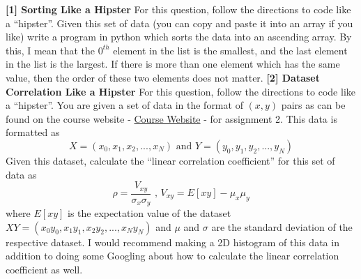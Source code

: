 \documentclass[12pt]{article}
\begin{document}
\newline
\textbf{[1] Sorting Like a Hipster}
\newline
For this question, follow the directions to code like a ``hipster''.  
\newline
\newline
Given this set of data (you can copy and paste it into an array if you like)
\newline
\newline
[71, 51, 32, 62, 84, 109, 43, 92, 72, 41, 102, 80, 72, 69, 46, 94, 52, 95, 90, 72, 63, 70, 34, 80, 78, 34, 31, 37, 26, 41, 42, 107, 33, 108, 108, 75, 66, 23, 90, 53, 24, 70, 26, 41, 93, 24, 71, 39, 48, 66, 97, 107, 77, 71, 67, 39, 38, 107, 96, 92, 84, 46, 60, 95, 87, 90, 92, 63, 78, 78, 84, 107, 70, 108, 32, 36, 93, 108, 49, 72, 56, 43, 30, 56, 51, 97, 45, 92, 40, 43, 49, 83, 98, 28, 99, 97, 102, 89, 58, 87]
\newline
\newline
write a program in python which sorts the data into an ascending array.  By this, I mean that the $0^{th}$ element in the list is the smallest, and the last element in the list is the largest.  If there is more than one element which has the same value, then the order of these two elements does not matter.  
\newline
\newline
\textbf{[2] Dataset Correlation Like a Hipster}
\newline
For this question, follow the directions to code like a ``hipster''.  
\newline
\newline
You are given a set of data in the format of $(x,y)$ pairs as can be found on the course website - \href{https://sites.google.com/a/aims.edu.gh/the-life-of-a-particle}{Course Website} - for assignment 2.  This data is formatted as
\begin{displaymath}
X=(x_0, x_1, x_2, ..., x_N) \textrm{  and  } Y=(y_0, y_1, y_2, ..., y_N)
\end{displaymath}
Given this dataset, calculate the ``linear correlation coefficient'' for this set of data as
\begin{displaymath}
\rho=\frac{V_{xy}}{\sigma_{x}\sigma_{y}} \textrm{  ,  } V_{xy}=E[xy]-\mu_{x}\mu_{y}
\end{displaymath}
where $E[xy]$ is the expectation value of the dataset $XY=(x_{0}y_{0}, x_{1}y_{1}, x_{2}y_{2}, ..., x_{N}y_{N})$ and $\mu$ and $\sigma$ are the standard deviation of the respective dataset.  I would recommend making a 2D histogram of this data in addition to doing some Googling about how to calculate the linear correlation coefficient as well.
\end{document}
